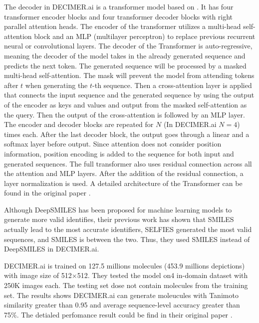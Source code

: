 \documentclass[12pt]{article}
\begin{document}
The decoder in DECIMER.ai is a transformer model based on \autocite{attention_is_all_you_need}. It has four transformer encoder blocks and four transformer decoder blocks with right parallel attention heads. \autocite{decimer} The encoder of the transformer utilizes a multi-head self-attention block and an MLP (multilayer perceptron) to replace previous recurrent neural or convolutional layers. The decoder of the Transformer is auto-regressive, meaning the decoder of the model takes in the already generated sequence and predicts the next token. The generated sequence will be processed by a masked multi-head self-attention. The mask will prevent the model from attending tokens after $t$ when generating the $t$-th sequence. Then a cross-attention layer is applied that connects the input sequence and the generated sequence by using the output of the encoder as keys and values and output from the masked self-attention as the query. Then the output of the cross-attention is followed by an MLP layer. The encoder and decoder blocks are repeated for $N$ (In DECIMER.ai $N=4$) times each. After the last decoder block, the output goes through a linear and a softmax layer before output. Since attention does not consider position information, position encoding is added to the sequence for both input and generated sequences. The full transformer also uses residual connection across all the attention and MLP layers. After the addition of the residual connection, a layer normalization is used. A detailed architecture of the Transformer can be found in the original paper \autocite{attention_is_all_you_need}. 

Although DeepSMILES \autocite{oboyle_deepsmiles:_2018} has been proposed for machine learning models to generate more valid identifies, their previous work \autocite{rajan_performance_2022} has shown that SMILES actually lead to the most accurate identifiers, SELFIES \autocite{krenn_self-referencing_2020} generated the most valid sequences, and SMILES is between the two. Thus, they used SMILES instead of DeepSMILES in DECIMER.ai. \autocite{decimer}  

DECIMER.ai is trained on 127.5 millions molecules (453.9 millions depictions) with image size of 512$\times$512. They tested the model on4 in-domain dataset with 250K images each. The testing set dose not contain molecules from the training set. The results shows DECIMER.ai can generate moleucules with Tanimoto similarity greater than 0.95 and average sequence-level accuracy greater than 75\%. The detialed perfomance result could be find in their original paper \autocite{decimer}. 
\end{document}
